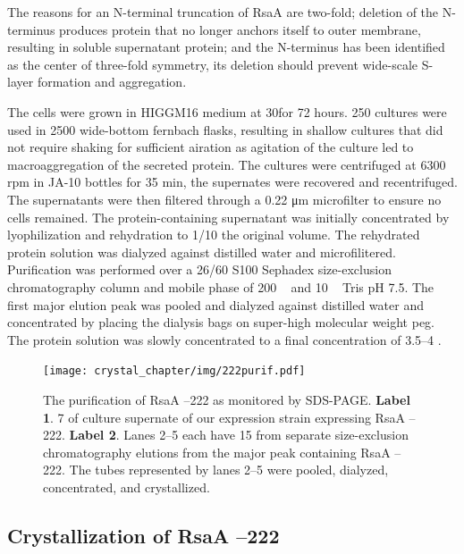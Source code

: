 The reasons for an N-terminal truncation of RsaA are two-fold; deletion
of the N-terminus produces protein that no longer anchors itself to
outer membrane, resulting in soluble supernatant protein; and the
N-terminus has been identified as the center of three-fold symmetry, its
deletion should prevent wide-scale \ac{S-layer} formation and aggregation.

The cells were grown in HIGGM16 medium
at 30\cel for 72 hours. 250 \millilitre cultures
were used in 2500 \millilitre wide-bottom fernbach flasks, resulting in shallow
cultures that did not require shaking for sufficient airation as
agitation of the culture led to macroaggregation of the secreted
protein. The cultures were centrifuged at 6300 rpm in JA-10 bottles for
35 min, the supernates were recovered and recentrifuged. The
supernatants were then filtered through a 0.22 \si{\micro\meter} microfilter to ensure
no cells remained. The protein-containing supernatant was initially
concentrated by lyophilization and rehydration to 1/10 the original
volume. The rehydrated protein solution was dialyzed against distilled
water and microfilitered. Purification was performed over a 26/60 S100
Sephadex size-exclusion chromatography column and mobile phase of 200 \si{\milli\molar}  and 10 \si{\milli\molar}
Tris pH 7.5. The first major elution peak was pooled and dialyzed
against distilled water and concentrated by placing the dialysis bags on
super-high molecular weight \ac{peg}. The protein
solution was slowly concentrated to a final concentration of 3.5--4
\mgperml.

\begin{figure}[p]
  	\begin{center}
   		\texttt{[image: crystal\_chapter/img/222purif.pdf]}
   	\end{center}
   	\caption[Purification of RsaA --222 shown by \ac{SDS-PAGE}]{
      The purification of RsaA --222 as monitored by \ac{SDS-PAGE}. \textbf{Label 1}. 7 \microlitre{} of culture supernate of our \caulobacter{} expression strain expressing RsaA --222. \textbf{Label 2}. Lanes 2--5 each have 15 \microlitre{} from separate  size-exclusion chromatography elutions from the major peak containing RsaA --222. The tubes represented by lanes 2--5 were pooled, dialyzed, concentrated, and crystallized.
}
   	\label{fig:222purif}
\end{figure}   

\subsection{Crystallization of RsaA --222}\label{crystallization}

